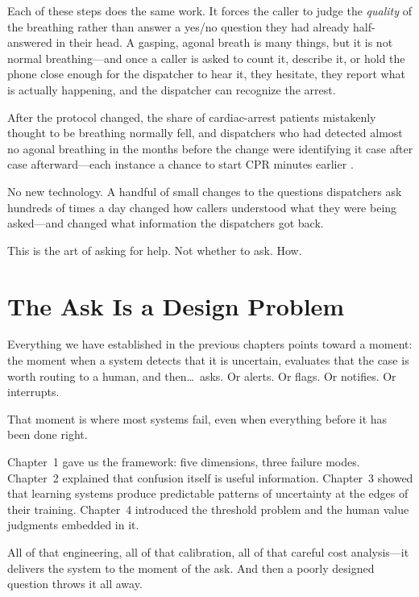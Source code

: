 Each of these steps does the same work. It forces the caller to judge the \emph{quality} of the breathing rather than answer a yes/no question they had already half-answered in their head. A gasping, agonal breath is many things, but it is not normal breathing---and once a caller is asked to count it, describe it, or hold the phone close enough for the dispatcher to hear it, they hesitate, they report what is actually happening, and the dispatcher can recognize the arrest.

After the protocol changed, the share of cardiac-arrest patients mistakenly thought to be breathing normally fell, and dispatchers who had detected almost no agonal breathing in the months before the change were identifying it case after case afterward---each instance a chance to start CPR minutes earlier \autocite{roppolo2009agonal}.

No new technology. A handful of small changes to the questions dispatchers ask hundreds of times a day changed how callers understood what they were being asked---and changed what information the dispatchers got back.

This is the art of asking for help. Not whether to ask. How.

\section{The Ask Is a Design Problem}
\label{sec:ch05-design-problem}

Everything we have established in the previous chapters points toward a moment: the moment when a system detects that it is uncertain, evaluates that the case is worth routing to a human, and then\ldots\ asks. Or alerts. Or flags. Or notifies. Or interrupts.

That moment is where most \hitl systems fail, even when everything before it has been done right.

Chapter~1 gave us the framework: five dimensions, three failure modes. Chapter~2 explained that confusion itself is useful information. Chapter~3 showed that learning systems produce predictable patterns of uncertainty at the edges of their training. Chapter~4 introduced the threshold problem and the human value judgments embedded in it.

All of that engineering, all of that calibration, all of that careful cost analysis---it delivers the system to the moment of the ask. And then a poorly designed question throws it all away.


